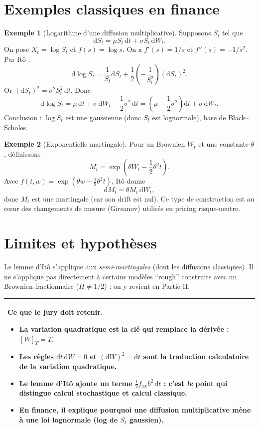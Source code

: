 \documentclass[11pt,a4paper]{report}
\newcommand{\dd}{\mathrm{d}}
\newcommand{\1}{\mathbbm{1}}
\theoremstyle{definition}
\newtheorem{example}{Exemple}[chapter]
\theoremstyle{plain}
\theoremstyle{remark}
\newenvironment{jurybox}{%
  \begin{center}
  \setlength{\tabcolsep}{6pt}%
  \renewcommand{\arraystretch}{1.1}%
  \begin{tabular}{|p{0.94\textwidth}|}
  \hline
  \small\textbf{Ce que le jury doit retenir.}\par\medskip
}{%
  \\ \hline
  \end{tabular}
  \end{center}
}
\begin{document}
\section{Exemples classiques en finance}
\label{sec:examples_ito}

\begin{example}[Logarithme d'une diffusion multiplicative]
Supposons $S_t$ tel que
\[
\dd S_t = \mu S_t\,\dd t + \sigma S_t\,\dd W_t.
\]
On pose $X_t=\log S_t$ et $f(s)=\log s$.
On a $f'(s)=1/s$ et $f''(s)=-1/s^2$.
Par Itô :
\[
\dd \log S_t
= \frac{1}{S_t}\dd S_t + \frac12\left(-\frac{1}{S_t^2}\right)(\dd S_t)^2.
\]
Or $(\dd S_t)^2=\sigma^2 S_t^2\,\dd t$.
Donc
\[
\dd \log S_t
= \mu\,\dd t + \sigma\,\dd W_t - \frac12\sigma^2\,\dd t
= \left(\mu-\frac12\sigma^2\right)\dd t + \sigma\,\dd W_t.
\]
Conclusion : $\log S_t$ est une gaussienne (donc $S_t$ est lognormale), base de Black--Scholes.
\end{example}

\begin{example}[Exponentielle martingale]
Pour un Brownien $W_t$ et une constante $\theta$, définissons
\[
M_t = \exp\!\left(\theta W_t - \frac12\theta^2 t\right).
\]
Avec $f(t,w)=\exp(\theta w-\frac12\theta^2 t)$, Itô donne
\[
\dd M_t = \theta M_t\,\dd W_t,
\]
donc $M_t$ est une martingale (car son drift est nul).
Ce type de construction est au cœur des changements de mesure (Girsanov) utilisés en pricing risque-neutre.
\end{example}

\section{Limites et hypothèses}
Le lemme d'Itô s'applique aux \emph{semi-martingales} (dont les diffusions classiques).
Il ne s'applique pas directement à certains modèles ``rough'' construits avec un Brownien fractionnaire ($H\neq 1/2$) : on y revient en Partie II.

\begin{jurybox}
\begin{itemize}
\item La variation quadratique est la clé qui remplace la dérivée : $[W]_T=T$.
\item Les règles $\dd t\,\dd W=0$ et $(\dd W)^2=\dd t$ sont la traduction calculatoire de la variation quadratique.
\item Le lemme d'Itô ajoute un terme $\tfrac12 f_{xx}b^2\,\dd t$ : c'est \emph{le} point qui distingue calcul stochastique et calcul classique.
\item En finance, il explique pourquoi une diffusion multiplicative mène à une loi lognormale (log de $S_t$ gaussien).
\end{itemize}
\end{jurybox}
\end{document}

